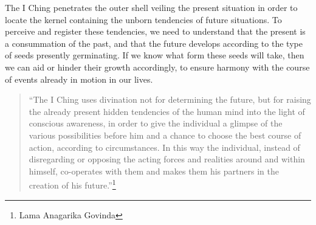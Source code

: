 \documentclass[11pt]{book}
\begin{document}
The I Ching penetrates the outer shell veiling the present situation in order to locate the kernel containing the unborn tendencies of future situations. To perceive and register these tendencies, we need to understand that the present is a consummation of the past, and that the future develops according to the type of seeds presently germinating. If we know what form these seeds will take, then we can aid or hinder their growth accordingly, to ensure harmony with the course of events already in motion in our lives.

\begin{quote}
``The I Ching uses divination not for determining the future, but for raising the already present hidden tendencies of the human mind into the light of conscious awareness, in order to give the individual a glimpse of the various possibilities before him and a chance to choose the best course of action, according to circumstances. In this way the individual, instead of disregarding or opposing the acting forces and realities around and within himself, co-operates with them and makes them his partners in the creation of his future.''\footnote{Lama Anagarika Govinda}
\end{quote}
\end{document}
